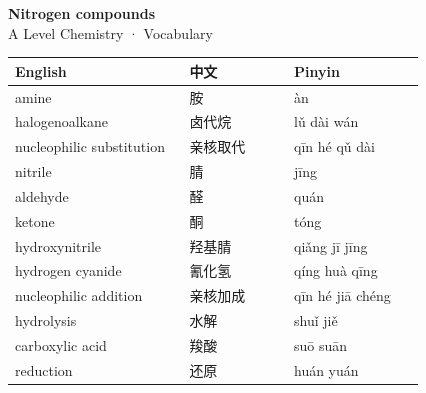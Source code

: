 \documentclass[11pt]{article}
\begin{document}
\begin{center}
  {\LARGE\bfseries Nitrogen compounds}\\[0.35em]
  {\large A Level Chemistry · Vocabulary}
\end{center}
\vspace{0.6em}

\begin{longtable}{@{}p{0.40\linewidth}p{0.24\linewidth}p{0.30\linewidth}@{}}
\toprule
\textbf{English} & \textbf{中文} & \textbf{Pinyin} \\
\midrule
\endhead
\bottomrule
\endlastfoot
amine & 胺 & àn \\
halogenoalkane & 卤代烷 & lǔ dài wán \\
nucleophilic substitution & 亲核取代 & qīn hé qǔ dài \\
nitrile & 腈 & jīng \\
aldehyde & 醛 & quán \\
ketone & 酮 & tóng \\
hydroxynitrile & 羟基腈 & qiǎng jī jīng \\
hydrogen cyanide & 氰化氢 & qíng huà qīng \\
nucleophilic addition & 亲核加成 & qīn hé jiā chéng \\
hydrolysis & 水解 & shuǐ jiě \\
carboxylic acid & 羧酸 & suō suān \\
reduction & 还原 & huán yuán \\
\end{longtable}
\end{document}
